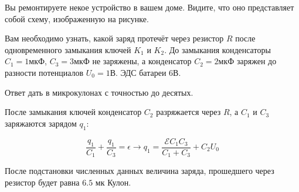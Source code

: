 
Вы ремонтируете некое устройство в вашем доме. Видите, что оно представляет собой схему, изображенную на рисунке.


Вам необходимо узнать, какой заряд протечёт через резистор $ R $ после одновременного замыкания ключей 
$ K_1 $ и $ K_2 $. До замыкания конденсаторы $ C_1 = 1\text{мкФ}$, $ C_3 = 3\text{мкФ}$ не заряжены, 
а конденсатор $ C_2 = 2\text{мкФ}$ заряжен до разности потенциалов $ U_0 = 1\text{В}$. ЭДС батареи $ 6\text{В} $. 

Ответ дать в микрокулонах с точностью до десятых.


\solutionSection

После замыкания ключей конденсатор $C_2$ разряжается через $R$, а $C_1$ 
и $C_3$ заряжаются зарядом $q_1$:

$$\frac{q_1}{C_1} + \frac{q_1}{C_3} = \epsilon \rightarrow q_1 = \frac{\mathcal{E}C_1C_3}{C_1+C_3} +C_2U_0$$
 
После подстановки численных данных величина заряда, 
прошедшего через резистор будет равна $6.5$ мк Кулон.


